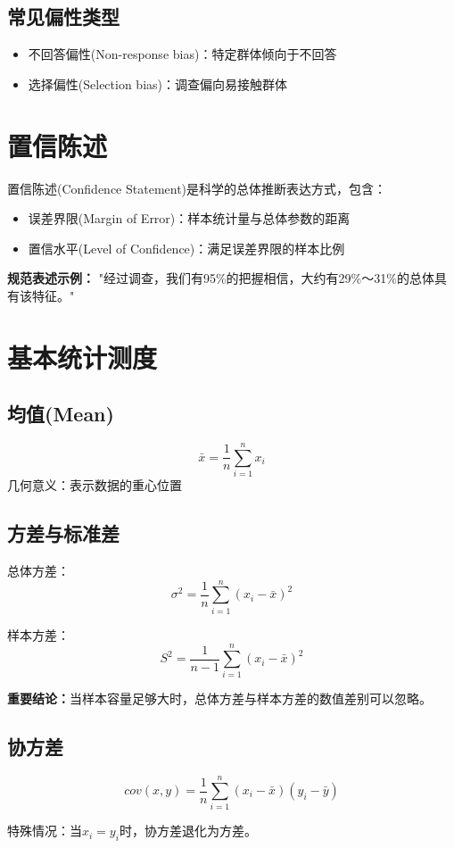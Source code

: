 \documentclass{article}
\begin{document}
\begin{CJK}{UTF8}{gbsn}
\subsection{常见偏性类型}
\begin{itemize}
    \item 不回答偏性(Non-response bias)：特定群体倾向于不回答
    \item 选择偏性(Selection bias)：调查偏向易接触群体
\end{itemize}

\section{置信陈述}

置信陈述(Confidence Statement)是科学的总体推断表达方式，包含：
\begin{itemize}
    \item 误差界限(Margin of Error)：样本统计量与总体参数的距离
    \item 置信水平(Level of Confidence)：满足误差界限的样本比例
\end{itemize}

\textbf{规范表述示例：}
"经过调查，我们有95\%的把握相信，大约有29\%～31\%的总体具有该特征。"

\section{基本统计测度}

\subsection{均值(Mean)}
\[ \bar{x} = \frac{1}{n}\sum_{i=1}^n x_i \]
几何意义：表示数据的重心位置

\subsection{方差与标准差}
总体方差：
\[ \sigma^2 = \frac{1}{n}\sum_{i=1}^n (x_i - \bar{x})^2 \]

样本方差：
\[ S^2 = \frac{1}{n-1}\sum_{i=1}^n (x_i - \bar{x})^2 \]

\textbf{重要结论：}当样本容量足够大时，总体方差与样本方差的数值差别可以忽略。

\subsection{协方差}
\[ cov(x,y) = \frac{1}{n}\sum_{i=1}^n (x_i - \bar{x})(y_i - \bar{y}) \]

特殊情况：当$x_i = y_i$时，协方差退化为方差。

\end{CJK}
\end{document}
